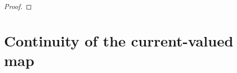 \documentclass[12pt]{amsbook}%
\theoremstyle{definition}
\theoremstyle{remark}
\numberwithin{section}{chapter}
\numberwithin{subsection}{section}
\numberwithin{figure}{chapter}
\def\cF{{\mathscr{F}}}
\def\fu{{\mathfrak{u}}}
\def\fuwp{{\mathfrak{u}_w^+}}
\def\fuwm{{\mathfrak{u}_w^-}}
\begin{document}
{{\begin{proof}
%
\end{proof}









\section{Continuity of the current-valued map}\label{sec:cylinders_and_continuity}

}}
\end{document}
